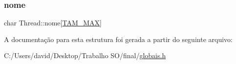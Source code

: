 \mbox{\label{struct_thread_a6f2b83a36d4f1c604dc4c55181561f21}} 
\subsubsection{\texorpdfstring{nome}{nome}}
{\footnotesize\ttfamily char Thread\+::nome\mbox{[}\hyperlink{globais_8h_ac0cf2902c27019004022f788b44d0f5e}{T\+A\+M\+\_\+\+M\+AX}\mbox{]}}



A documentação para esta estrutura foi gerada a partir do seguinte arquivo\+:\begin{DoxyCompactItemize}
\item 
C\+:/\+Users/david/\+Desktop/\+Trabalho S\+O/final/\hyperlink{globais_8h}{globais.\+h}\end{DoxyCompactItemize}
